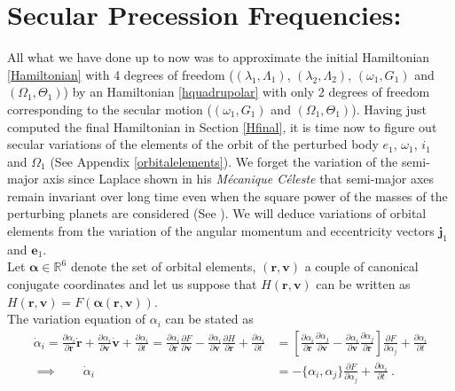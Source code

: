 \documentclass[a4paper]{article}
\begin{document}
\section{Secular Precession Frequencies: }
All what we have done up to now was to approximate the initial Hamiltonian \eqref{Hamiltonian} with 4 degrees of freedom ($(\lambda_{1},\Lambda_{1})$, $(\lambda_{2},\Lambda_{2})$, $(\omega_{1},G_{1})$ and $(\Omega_{1}, \Theta_{1})$) by an Hamiltonian \eqref{hquadrupolar} with only 2 degrees of freedom corresponding to the secular motion ($(\omega_{1},G_{1})$ and $(\Omega_{1}, \Theta_{1})$). Having just computed the final Hamiltonian in Section \ref{Hfinal}, it is time now to figure out secular variations of the elements of the orbit of the perturbed body $e_{1}$, $\omega_{1}$, $i_{1}$ and $\Omega_{1}$ (See Appendix \ref{orbitalelements}). We forget the variation of the semi-major axis since Laplace shown in his \textit{M\'ecanique C\'eleste} that semi-major axes remain invariant over long time even when the square power of the masses of the perturbing planets are considered (See \cite{Boccaletti2}).
We will deduce variations of orbital elements from the variation of the angular momentum and eccentricity vectors $\mathbf j_{1}$ and $\mathbf e_{1}$. \\
Let $\mathbf \alpha \in \mathbb R^{6}$ denote the set of orbital elements, $(\mathbf r, \mathbf v)$ a couple of canonical conjugate coordinates and let us suppose that $H(\mathbf r, \mathbf v)$ can be written as $H(\mathbf r, \mathbf v)=F(\mathbf \alpha(\mathbf r, \mathbf v))$. \\
The variation equation of $\alpha_{i}$ can be stated as
\begin{align}
\dot \alpha_{i} = \frac{\partial \alpha_{i}}{\partial \mathbf r} \dot{ \mathbf r} + \frac{\partial \alpha_{i}}{\partial \mathbf v} \dot { \mathbf v }+\frac{\partial \alpha_{i}}{\partial t} =  \frac{\partial \alpha_{i}}{\partial \mathbf r} \frac{\partial F}{\partial \mathbf v} - \frac{\partial \alpha_{i}}{\partial \mathbf v} \frac{\partial H}{\partial \mathbf r} + \frac{\partial \alpha_{i}}{\partial t} &= \left [ \frac{\partial \alpha_{i}}{\partial \mathbf r} \frac{\partial \alpha_{j}}{\partial \mathbf v} - \frac{\partial \alpha_{i}}{\partial \mathbf v} \frac{\partial \alpha_{j}}{\partial \mathbf r} \right ] \frac{\partial F}{\partial \alpha_{j}} + \frac{\partial \alpha_{i}}{\partial t}  \\
\implies \qquad \dot \alpha_{i} &= - \{\alpha_{i}, \alpha_{j}\} \frac{\partial F}{\partial \alpha_{j}} + \frac{\partial \alpha_{i}}{\partial t} \ .
\end{align}
\end{document}
